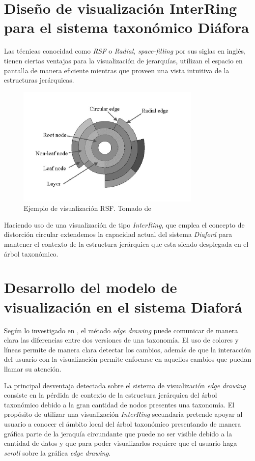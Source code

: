 \documentclass[journal]{IEEEtran}
\begin{document}
\section{Diseño de visualización InterRing para el sistema taxonómico Diáfora}
Las técnicas conocidad como \emph{RSF} o \emph{Radial, space-filling} por sus siglas en inglés,
 tienen ciertas ventajas
para la visualización de jerarquías, utilizan el espacio en pantalla de manera eficiente mientras que proveen una vista intuitiva 
de la estructuras jerárquicas.
\begin{figure}[]
  \centering
  \includegraphics[scale=0.6]{interring}
  \caption{Ejemplo de visualización RSF. Tomado  de \cite{yang_ward_rundensteiner}}
\end{figure}

Haciendo uso de una visualización de tipo \emph{InterRing}\cite{yang_ward_rundensteiner}, que emplea
el concepto de distorción circular extendemos la capacidad actual del sistema \emph{Diaforá} para mantener el contexto
de la estructura jerárquica que esta siendo desplegada en el árbol taxonómico.

\section{Desarrollo del modelo de visualización en el sistema Diaforá}
Según lo investigado en \cite{sancho_diafora}, el método \emph{edge drawing} puede comunicar de manera clara las
diferencias entre dos versiones de una taxonomía. El uso de colores y líneas permite de manera clara detectar los
cambios, además de que la interacción del usuario con la visualización permite enfocarse en aquellos cambios que 
puedan llamar su atención.

La principal desventaja detectada sobre el sistema de visualización \emph{edge drawing} consiste en la pérdida de contexto
de la estructura jerárquica del árbol taxonómico debido a la gran cantidad de nodos presentes una taxonomía.
El propósito de utilizar una visualización \emph{InterRing}\cite{yang_ward_rundensteiner} secundaria pretende apoyar al usuario a conocer
el ámbito local del árbol taxonómico presentando de manera gráfica parte de la jeraquía circundante que puede no ser visible debido a la cantidad de datos
y que para poder visualizarlos requiere que el usuario haga \emph{scroll} sobre la gráfica \emph{edge drawing}.
\end{document}
